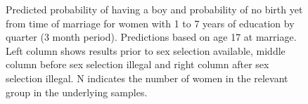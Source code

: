 \documentclass[12pt,letterpaper]{article}
\begin{document}
\begin{figure}[htpb]
{\begin{minipage}{0.31\textwidth}
\captionsetup[subfigure]{labelformat=parens}
\end{minipage}
}
\setcounter{subfigure}{3}
\caption{Predicted probability of having a boy and probability of
no birth yet from time of marriage for women with 1 to 7 years of education by quarter (3 month
period). 
Predictions based on age 17 at marriage.
Left column shows results prior to sex selection available, middle column before
sex selection illegal and right column after sex selection illegal.
N indicates the number of women in the relevant group in the underlying samples.
}
\label{fig:results_spell1_med}
\end{figure}
\end{document}

